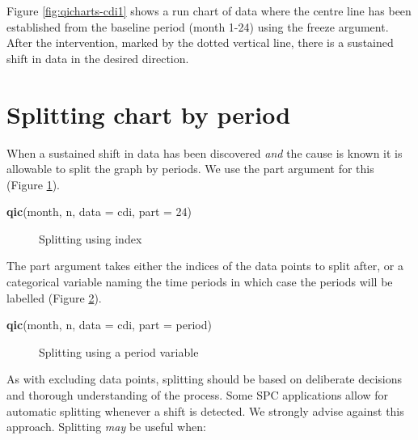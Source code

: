 \documentclass[
]{book}
\makeatletter
\newenvironment{Shaded}{\begin{snugshade}}{\end{snugshade}}
\newcommand{\AttributeTok}[1]{\textcolor[rgb]{0.13,0.29,0.53}{#1}}
\newcommand{\DecValTok}[1]{\textcolor[rgb]{0.00,0.00,0.81}{#1}}
\newcommand{\FunctionTok}[1]{\textcolor[rgb]{0.13,0.29,0.53}{\textbf{#1}}}
\newcommand{\NormalTok}[1]{#1}
\newcommand*\pandocbounded[1]{%
  \sbox\pandoc@box{#1}%
  \Gscale@div\@tempa{\textheight}{\dimexpr\ht\pandoc@box+\dp\pandoc@box\relax}%
  \Gscale@div\@tempb{\linewidth}{\wd\pandoc@box}%
  \ifdim\@tempb\p@<\@tempa\p@\let\@tempa\@tempb\fi%
  \ifdim\@tempa\p@<\p@\scalebox{\@tempa}{\usebox\pandoc@box}%
  \else\usebox{\pandoc@box}%
  \fi%
}
\makeatother
\begin{document}
Figure \ref{fig:qicharts-cdi1} shows a run chart of data where the centre line has been established from the baseline period (month 1-24) using the freeze argument. After the intervention, marked by the dotted vertical line, there is a sustained shift in data in the desired direction.

\section{Splitting chart by period}\label{splitting-chart-by-period}

When a sustained shift in data has been discovered \emph{and} the cause is known it is allowable to split the graph by periods. We use the part argument for this (Figure \ref{fig:qicharts-cdi2}).

\begin{Shaded}
\begin{Highlighting}[]
\FunctionTok{qic}\NormalTok{(month, n, }\AttributeTok{data =}\NormalTok{ cdi, }\AttributeTok{part =} \DecValTok{24}\NormalTok{)}
\end{Highlighting}
\end{Shaded}

\begin{figure}
\centering
\pandocbounded{}
\caption{\label{fig:qicharts-cdi2}Splitting using index}
\end{figure}

The part argument takes either the indices of the data points to split after, or a categorical variable naming the time periods in which case the periods will be labelled (Figure \ref{fig:qicharts-cdi3}).

\begin{Shaded}
\begin{Highlighting}[]
\FunctionTok{qic}\NormalTok{(month, n, }\AttributeTok{data =}\NormalTok{ cdi, }\AttributeTok{part =}\NormalTok{ period)}
\end{Highlighting}
\end{Shaded}

\begin{figure}
\centering
\pandocbounded{}
\caption{\label{fig:qicharts-cdi3}Splitting using a period variable}
\end{figure}

As with excluding data points, splitting should be based on deliberate decisions and thorough understanding of the process. Some SPC applications allow for automatic splitting whenever a shift is detected. We strongly advise against this approach. Splitting \emph{may} be useful when:
\end{document}
